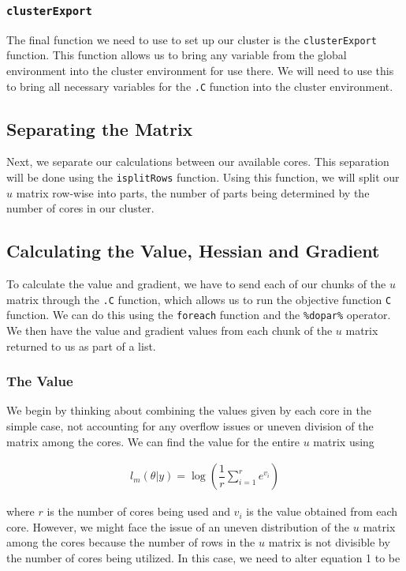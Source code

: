 \documentclass{article}
\begin{document}
\subsubsection{\texttt{clusterExport}}
The final function we need to use to set up our cluster is the \texttt{clusterExport} function. This function allows us to bring any variable from the global environment into the cluster environment for use there. We will need to use this to bring all necessary variables for the \texttt{.C} function into the cluster environment.

\subsection{Separating the Matrix}
Next, we separate our calculations between our available cores. This separation will be done using the \texttt{isplitRows} function. Using this function, we will split our $u$ matrix row-wise into parts, the number of parts being determined by the number of cores in our cluster.

\subsection{Calculating the Value, Hessian and Gradient}
To calculate the value and gradient, we have to send each of our chunks of the $u$ matrix through the \texttt{.C} function, which allows us to run the objective function \texttt{C} function. We can do this using the \texttt{foreach} function and the \texttt{\%dopar\%} operator. We then have the value and gradient values from each chunk of the $u$ matrix returned to us as part of a list.

\subsubsection{The Value}
We begin by thinking about combining the values given by each core in the simple case, not accounting for any overflow issues or uneven division of the matrix among the cores. We can find the value for the entire $u$ matrix using

\begin{align}
l_m(\theta|y) = \log\left(\dfrac{1}{r}\sum\limits_{i=1}^r e^{v_i}\right)
\end{align}

\noindent where $r$ is the number of cores being used and $v_i$ is the value obtained from each core. However, we might face the issue of an uneven distribution of the $u$ matrix among the cores because the number of rows in the $u$ matrix is not divisible by the number of cores being utilized. In this case, we need to alter equation 1 to be
\end{document}
